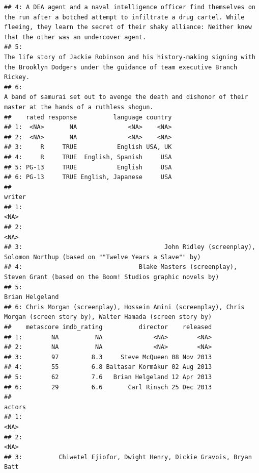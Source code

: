 \documentclass[
  b5paper]{book}
\begin{document}
\begin{verbatim}
## 4: A DEA agent and a naval intelligence officer find themselves on the run after a botched attempt to infiltrate a drug cartel. While fleeing, they learn the secret of their shaky alliance: Neither knew that the other was an undercover agent.
## 5:                                                                                                  The life story of Jackie Robinson and his history-making signing with the Brooklyn Dodgers under the guidance of team executive Branch Rickey.
## 6:                                                                                                                                   A band of samurai set out to avenge the death and dishonor of their master at the hands of a ruthless shogun.
##    rated response          language country
## 1:  <NA>       NA              <NA>    <NA>
## 2:  <NA>       NA              <NA>    <NA>
## 3:     R     TRUE           English USA, UK
## 4:     R     TRUE  English, Spanish     USA
## 5: PG-13     TRUE           English     USA
## 6: PG-13     TRUE English, Japanese     USA
##                                                                                                                    writer
## 1:                                                                                                                   <NA>
## 2:                                                                                                                   <NA>
## 3:                                       John Ridley (screenplay), Solomon Northup (based on ""Twelve Years a Slave"" by)
## 4:                                Blake Masters (screenplay), Steven Grant (based on the Boom! Studios graphic novels by)
## 5:                                                                                                        Brian Helgeland
## 6: Chris Morgan (screenplay), Hossein Amini (screenplay), Chris Morgan (screen story by), Walter Hamada (screen story by)
##    metascore imdb_rating          director    released
## 1:        NA          NA              <NA>        <NA>
## 2:        NA          NA              <NA>        <NA>
## 3:        97         8.3     Steve McQueen 08 Nov 2013
## 4:        55         6.8 Baltasar Kormákur 02 Aug 2013
## 5:        62         7.6   Brian Helgeland 12 Apr 2013
## 6:        29         6.6       Carl Rinsch 25 Dec 2013
##                                                                 actors
## 1:                                                                <NA>
## 2:                                                                <NA>
## 3:          Chiwetel Ejiofor, Dwight Henry, Dickie Gravois, Bryan Batt

\end{verbatim}
\end{document}
